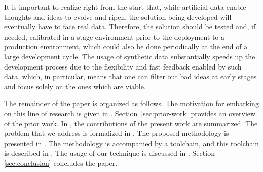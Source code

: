 It is important to realize right from the start that, while artificial data
enable thoughts and ideas to evolve and ripen, the solution being developed will
eventually have to face real data. Therefore, the solution should be tested and,
if needed, calibrated in a stage environment prior to the deployment to a
production environment, which could also be done periodically at the end of a
large development cycle. The usage of synthetic data substantially speeds up the
development process due to the flexibility and fast feedback enabled by such
data, which, in particular, means that one can filter out bad ideas at early
stages and focus solely on the ones which are viable.

The remainder of the paper is organized as follows. The motivation for embarking
on this line of research is given in .
Section~\ref{sec:prior-work} provides an overview of the prior work. In
, the contributions of the present work are summarized. The
problem that we address is formalized in . The
proposed methodology is presented in . The methodology is
accompanied by a toolchain, and this toolchain is described in .
The usage of our technique is discussed in . Section
\ref{sec:conclusion} concludes the paper.
